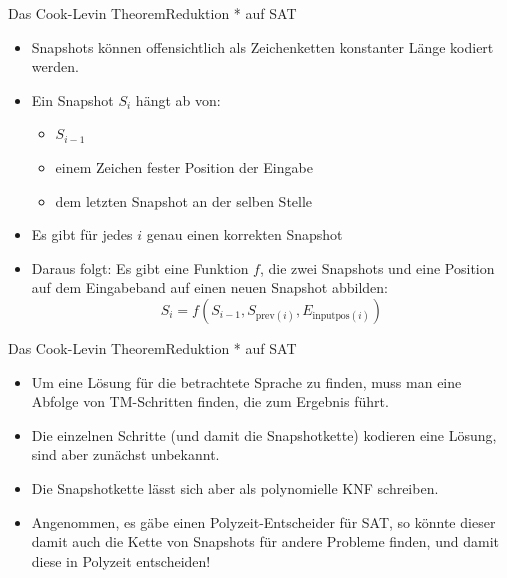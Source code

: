 \documentclass[ignorenonframetext,]{beamer}
\begin{document}
\begin{frame}{Das Cook-Levin Theorem}{Reduktion * auf SAT}

\begin{itemize}
\itemsep1pt\parskip0pt
\item
  Snapshots können offensichtlich als Zeichenketten konstanter Länge
  kodiert werden.
\item
  Ein Snapshot $S_i$ hängt ab von:

  \begin{itemize}
  \itemsep1pt\parskip0pt
  \item
    $S_{i-1}$
  \item
    einem Zeichen fester Position der Eingabe
  \item
    dem letzten Snapshot an der selben Stelle
  \end{itemize}
\item
  Es gibt für jedes $i$ genau einen korrekten Snapshot
\item
  Daraus folgt: Es gibt eine Funktion $f$, die zwei Snapshots und eine
  Position auf dem Eingabeband auf einen neuen Snapshot abbilden:
  \[S_i = f(S_{i-1}, S_{\mathrm{prev}(i)}, E_{\mathrm{inputpos}(i)})\]
\end{itemize}

\end{frame}

\begin{frame}{Das Cook-Levin Theorem}{Reduktion * auf SAT}

\begin{itemize}
\itemsep1pt\parskip0pt
\item
  Um eine Lösung für die betrachtete Sprache zu finden, muss man eine
  Abfolge von TM-Schritten finden, die zum Ergebnis führt.
\item
  Die einzelnen Schritte (und damit die Snapshotkette) kodieren eine
  Lösung, sind aber zunächst unbekannt.
\item
  Die Snapshotkette lässt sich aber als polynomielle KNF schreiben.
\item
  Angenommen, es gäbe einen Polyzeit-Entscheider für SAT, so könnte
  dieser damit auch die Kette von Snapshots für andere Probleme finden,
  und damit diese in Polyzeit entscheiden!
\end{itemize}

\end{frame}
\end{document}
